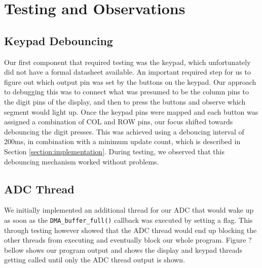 \section{Testing and Observations}
\label{section:testing_and_observations}
\subsection{Keypad Debouncing}
Our first component that required testing was the keypad, which unfortunately did not have a formal datasheet available. An important required step for us to figure out which output pin was set by the buttons on the keypad. Our approach to debugging this was to connect what was presumed to be the column pins to the digit pins of the display, and then to press the buttons and observe which segment would light up. Once the keypad pins were mapped and each button was assigned a combination of COL and ROW pins, our focus shifted towards debouncing the digit presses. This was achieved using a deboucing interval of 200ms, in combination with a minimum update count, which is described in Section \ref{section:implementation}. During testing, we observed that this debouncing mechanism worked without problems. %

\subsection{ADC Thread}
We initially implemented an additional thread for our ADC that would wake up as soon as the \verb|DMA_buffer_full()| callback was executed by setting a flag. This through testing however showed that the ADC thread would end up blocking the other threads from executing and eventually block our whole program. Figure ? bellow shows our program output and shows the display and keypad threads getting called until only the ADC thread output is shown.



